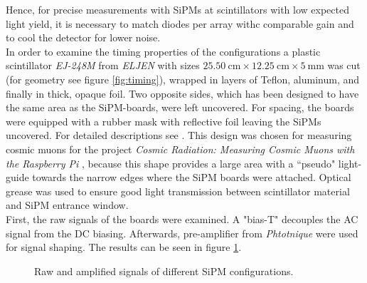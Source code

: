 \documentclass[12pt]{article}
\newcommand{\tit}[1]{\textit{#1}}
\begin{document}
Hence, for precise measurements with SiPMs at scintillators with low expected light yield, it is necessary to match diodes per array withc comparable gain and to cool the detector for lower noise. \\ \indent
In order to examine the timing properties of the configurations a plastic scintillator \tit{EJ-248M} from \tit{ELJEN} with sizes $\SI{25.50}{\centi\meter}\times\SI{12.25}{\centi\meter}\times\SI{5}{\milli\meter}$ was cut (for geometry see figure \ref{fig:timing}), wrapped in layers of Teflon, aluminum, and finally in thick, opaque foil. Two opposite sides, which has been designed to have the same area as the SiPM-boards, were left uncovered. For spacing, the boards were equipped with a rubber mask with reflective foil leaving the SiPMs uncovered. For detailed descriptions see \cite{Lukas_Thesis}. This design was chosen for measuring cosmic muons for the project \tit{Cosmic Radiation: Measuring Cosmic Muons with the Raspberry Pi} \cite{schauer_projekt}, because this shape provides a large area with a ``pseudo" light-guide towards the narrow edges where the SiPM boards were attached. Optical grease was used to ensure good light transmission between scintillator material and SiPM entrance window. \\ \indent 
First, the raw signals of the boards were examined. A "bias-T" \cite{Lukas_Thesis} decouples the AC signal from the DC biasing. Afterwards, pre-amplifier from \tit{Phtotnique} \cite{photonique} were used for signal shaping. The results can be seen in figure \ref{fig:signals}. \\ \indent
\begin{figure}[t!]
	\hfill
	\hfill
	\caption{Raw and amplified signals of different SiPM configurations.}
	\label{fig:signals}
\end{figure}
\end{document}
